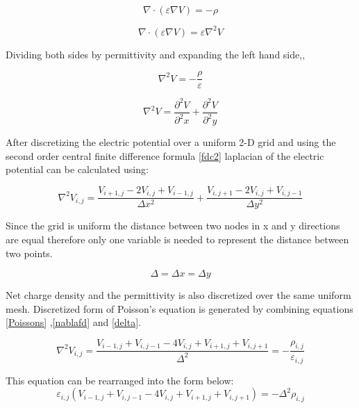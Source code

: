 \begin{doublespace}
\begin{equation}
\nabla \cdot  (\varepsilon \nabla V)=-\rho
\end{equation}

\begin{equation}
\nabla \cdot  (\varepsilon \nabla V)=\varepsilon  \nabla^2 V
\end{equation}

Dividing both sides by permittivity and expanding the left hand side,,

\begin{equation}
 \nabla^2 V =-\frac{\rho}{\varepsilon}
 \label{Poissons}
\end{equation}

\begin{equation}
 \nabla^2 V =\frac{\partial^2 V}{\partial^2 x}+\frac{\partial^2 V}{\partial^2 y}
\end{equation}

After discretizing the electric potential over a uniform 2-D grid and using the second order central finite difference formula \eqref{fdc2} laplacian of the electric potential can be calculated using\cite{NumModel}:

\begin{equation}
 \nabla^2 V_{i,j}=\frac{V_{i+1,j}-2V_{i,j}+V_{i-1,j}}{\Delta x^2}+\frac{V_{i,j+1}-2V_{i,j}+V_{i,j-1}}{\Delta y^2}
 \label{nablafd}
\end{equation}

Since the grid is uniform the distance between two nodes in x and y directions are equal therefore only one variable is needed to represent the distance between two points.

\begin{equation}
\Delta=\Delta x =\Delta y
\label{delta}
\end{equation}

Net charge density and the permittivity is also discretized over the same uniform mesh. Discretized form of Poisson's equation is generated by combining equations \ref{Poissons} ,\ref{nablafd} and \ref{delta}.

\begin{equation}
 \nabla^2 V_{i,j}=\frac{V_{i-1,j}+V_{i,j-1}-4V_{i,j}+V_{i+1,j}+V_{i,j+1}}{\Delta^2}=-\frac{\rho_{i,j}}{\varepsilon_{i,j}}
\end{equation}

This equation can be rearranged into the form below:
\begin{equation}
\varepsilon_{i,j}(V_{i-1,j}+V_{i,j-1}-4V_{i,j}+V_{i+1,j}+V_{i,j+1})=-\Delta^2\rho_{i,j}
\label{discrete_poisson}
\end{equation}




\end{doublespace}

